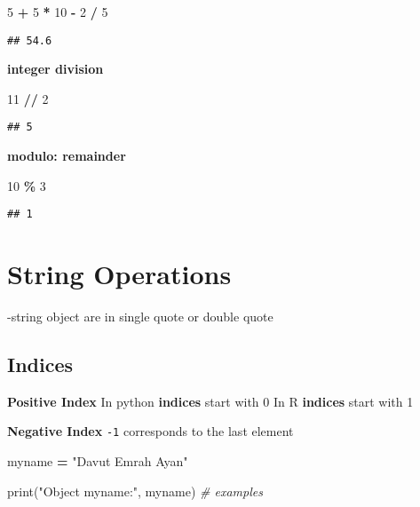\documentclass[
]{book}
\newenvironment{Shaded}{\begin{snugshade}}{\end{snugshade}}
\newcommand{\BuiltInTok}[1]{#1}
\newcommand{\CommentTok}[1]{\textcolor[rgb]{0.56,0.35,0.01}{\textit{#1}}}
\newcommand{\DecValTok}[1]{\textcolor[rgb]{0.00,0.00,0.81}{#1}}
\newcommand{\NormalTok}[1]{#1}
\newcommand{\OperatorTok}[1]{\textcolor[rgb]{0.81,0.36,0.00}{\textbf{#1}}}
\newcommand{\StringTok}[1]{\textcolor[rgb]{0.31,0.60,0.02}{#1}}
\begin{document}
\begin{Shaded}
\begin{Highlighting}[]
\DecValTok{5} \OperatorTok{+} \DecValTok{5} \OperatorTok{*} \DecValTok{10}  \OperatorTok{{-}} \DecValTok{2} \OperatorTok{/} \DecValTok{5}
\end{Highlighting}
\end{Shaded}

\begin{verbatim}
## 54.6
\end{verbatim}

\textbf{integer division}

\begin{Shaded}
\begin{Highlighting}[]
\DecValTok{11} \OperatorTok{//} \DecValTok{2}   
\end{Highlighting}
\end{Shaded}

\begin{verbatim}
## 5
\end{verbatim}

\textbf{modulo: remainder}

\begin{Shaded}
\begin{Highlighting}[]
\DecValTok{10} \OperatorTok{\%} \DecValTok{3}   
\end{Highlighting}
\end{Shaded}

\begin{verbatim}
## 1
\end{verbatim}

\hypertarget{string-operations}{%
\section{String Operations}\label{string-operations}}

-string object are in single quote or double quote

\hypertarget{indices}{%
\subsection{Indices}\label{indices}}

\textbf{Positive Index}
In python \textbf{indices} start with 0
In R \textbf{indices} start with 1

\textbf{Negative Index}
\texttt{-1} corresponds to the last element

\begin{Shaded}
\begin{Highlighting}[]
\NormalTok{myname }\OperatorTok{=} \StringTok{"Davut Emrah Ayan"}

\BuiltInTok{print}\NormalTok{(}\StringTok{"Object myname:"}\NormalTok{, myname)}
\CommentTok{\# examples}
\end{Highlighting}
\end{Shaded}
\end{document}
